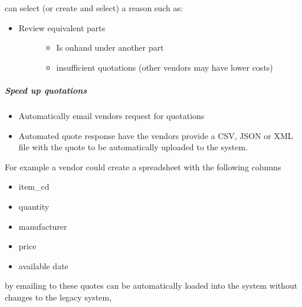 \documentclass[letterpaper,10pt,english]{sphinxmanual}
\begin{document}
can select (or create and select) a reason such as:
\begin{itemize}
\item {} \begin{description}
\item[{Review equivalent parts}] \leavevmode\begin{itemize}
\item {} 
Is onhand under another part

\item {} 
insufficient quotations (other vendors may have lower costs)

\end{itemize}

\end{description}

\end{itemize}


\subparagraph{Speed up quotations}
\label{\detokenize{FutureState:speed-up-quotations}}\begin{itemize}
\item {} 
Automatically email vendors request for quotations

\item {} 
Automated quote response have the vendors provide a CSV, JSON or XML
file with the quote to be automatically uploaded to the system.

\end{itemize}

For example a vendor could create a spreadsheet with the following
columns
\begin{itemize}
\item {} 
item\_cd

\item {} 
quantity

\item {} 
manufacturer

\item {} 
price

\item {} 
available date

\end{itemize}

by emailing to  these quotes can be automatically
loaded into the system without changes to the legacy system,
\end{document}
